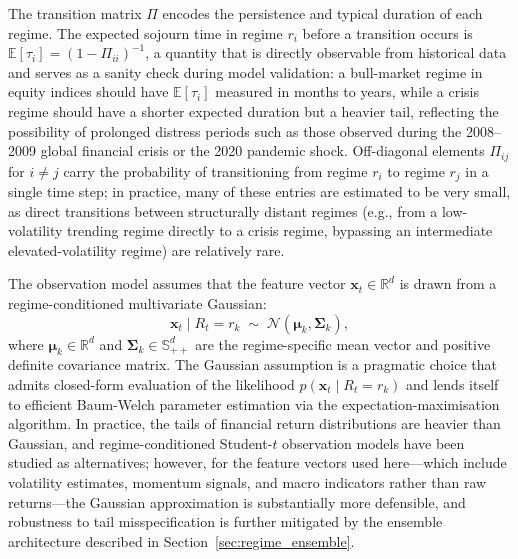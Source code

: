 \documentclass[12pt,openany]{book}
\numberwithin{equation}{chapter}
\theoremstyle{plain}
\theoremstyle{definition}
\theoremstyle{remark}
\begin{document}
The transition matrix $\Pi$ encodes the persistence and typical duration of each regime. The expected sojourn time in regime $r_i$ before a transition occurs is $\mathbb{E}[\tau_i] = (1 - \Pi_{ii})^{-1}$, a quantity that is directly observable from historical data and serves as a sanity check during model validation: a bull-market regime in equity indices should have $\mathbb{E}[\tau_i]$ measured in months to years, while a crisis regime should have a shorter expected duration but a heavier tail, reflecting the possibility of prolonged distress periods such as those observed during the 2008--2009 global financial crisis or the 2020 pandemic shock. Off-diagonal elements $\Pi_{ij}$ for $i \neq j$ carry the probability of transitioning from regime $r_i$ to regime $r_j$ in a single time step; in practice, many of these entries are estimated to be very small, as direct transitions between structurally distant regimes (e.g., from a low-volatility trending regime directly to a crisis regime, bypassing an intermediate elevated-volatility regime) are relatively rare.

The observation model assumes that the feature vector $\mathbf{x}_t \in \mathbb{R}^d$ is drawn from a regime-conditioned multivariate Gaussian:
\begin{equation}
    \mathbf{x}_t \mid R_t = r_k \;\sim\; \mathcal{N}(\boldsymbol{\mu}_k, \boldsymbol{\Sigma}_k),
\end{equation}
where $\boldsymbol{\mu}_k \in \mathbb{R}^d$ and $\boldsymbol{\Sigma}_k \in \mathbb{S}_{++}^d$ are the regime-specific mean vector and positive definite covariance matrix. The Gaussian assumption is a pragmatic choice that admits closed-form evaluation of the likelihood $p(\mathbf{x}_t \mid R_t = r_k)$ and lends itself to efficient Baum-Welch parameter estimation via the expectation-maximisation algorithm. In practice, the tails of financial return distributions are heavier than Gaussian, and regime-conditioned Student-$t$ observation models have been studied as alternatives; however, for the feature vectors used here---which include volatility estimates, momentum signals, and macro indicators rather than raw returns---the Gaussian approximation is substantially more defensible, and robustness to tail misspecification is further mitigated by the ensemble architecture described in Section~\ref{sec:regime_ensemble}.
\end{document}
